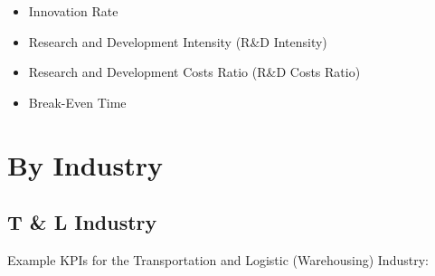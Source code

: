 \documentclass[]{book}
\providecommand{\tightlist}{%
  \setlength{\itemsep}{0pt}\setlength{\parskip}{0pt}}
\begin{document}
\begin{itemize}
  \begin{itemize}
  \tightlist
  \item
    Innovation Rate\\
  \item
    Research and Development Intensity (R\&D Intensity)
  \item
    Research and Development Costs Ratio (R\&D Costs Ratio)\\
  \item
    Break-Even Time
  \end{itemize}
\end{itemize}

\section{By Industry}\label{by-industry}

\subsection{T \& L Industry}\label{t-l-industry}

Example KPIs for the Transportation and Logistic (Warehousing) Industry:
\end{document}
